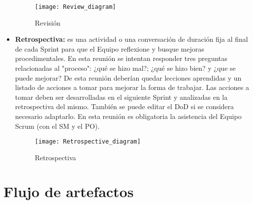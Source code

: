 \begin{itemize}
\begin{figure}[h]
  \centering
  \texttt{[image: Review\_diagram]}
  \caption{Revisión}
  \centering
  \label{fig:Review_diagram} %
\end{figure}
\FloatBarrier

\item \textbf{Retrospectiva:} es una actividad o una conversación de duración fija al final de cada Sprint para que el Equipo reflexione y busque mejoras procedimentales. En esta reunión se intentan responder tres preguntas relacionadas al "proceso": ¿qué se hizo mal?; ¿qué se hizo bien? y ¿que se puede mejorar?
De esta reunión deberían quedar lecciones aprendidas y un listado de acciones a tomar para mejorar la forma de trabajar. Las acciones a tomar deben ser desarrolladas en el siguiente Sprint y analizadas en la retrospectiva del mismo. También se puede editar el DoD si se considera necesario adaptarlo.
En esta reunión es obligatoria la asistencia del Equipo Scrum (con el SM y el PO).

\begin{figure}[h]
  \centering
  \texttt{[image: Retrospective\_diagram]}
  \caption{Retrospectiva}
  \centering
  \label{fig:Retrospective_diagram} %
\end{figure}
\FloatBarrier

\end{itemize}

\section{Flujo de artefactos}

